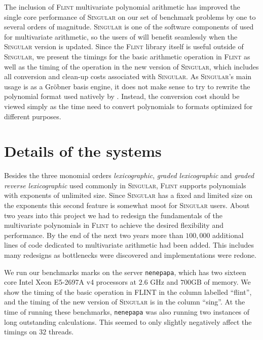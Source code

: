 \documentclass{deliverablereport}
\begin{document}
The inclusion of \textsc{Flint} multivariate polynomial arithmetic has improved the single core performance of \textsc{Singular} on our set of benchmark problems by one to several orders of magnitude. \textsc{Singular} is one of the software components of \Sage used for multivariate arithmetic, so the users of \Sage will benefit seamlessly when the \textsc{Singular} version is updated. Since the \textsc{Flint} library itself is useful outside of \textsc{Singular}, we present the timings for the basic arithmetic operation in \textsc{Flint} as well as the timing of the operation in the new version of \textsc{Singular}, which includes all conversion and clean-up costs associated with \textsc{Singular}. As \textsc{Singular}'s main usage is as a Gr\"obner basis engine, it does not make sense to try to rewrite the polynomial format used natively by . Instead, the conversion cost should be viewed simply as the time need to convert polynomials to formats optimized for different purposes.

\section{Details of the systems}
Besides the three monomial orders \emph{lexicographic}, \emph{graded lexicographic} and \emph{graded reverse lexicographic} used commonly in \textsc{Singular}, \textsc{Flint} supports polynomials with exponents of unlimited size. Since \textsc{Singular} has a fixed and limited size on the exponents this second feature is somewhat moot for \textsc{Singular} users. About two years into this project we had to redesign the fundamentals of the multivariate polynomials in \textsc{Flint} to achieve the desired flexibility and performance. By the end of the next two years more than $100,000$ additional lines of code dedicated to multivariate arithmetic had been added. This includes many redesigns as bottlenecks were discovered and implementations were redone.

We run our benchmarks marks on the server {\tt nenepapa}, which has two sixteen core Intel Xeon E5-2697A v4 processors at $2.6$ GHz and $700$GB of memory. We show the timing of the basic operation in \textsc{FLINT} in the column labelled ``flint'', and the timing of the new version of \textsc{Singular} is in the column ``sing''. At the time of running these benchmarks, {\tt nenepapa} was also running two instances of long outstanding calculations. This seemed to only slightly negatively affect the timings on $32$ threads. 
\end{document}
